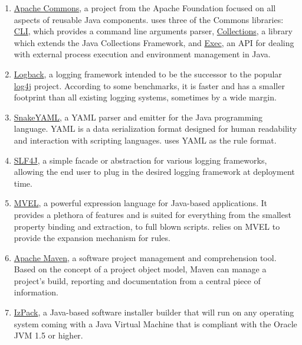 \documentclass[a4paper,twoside,12pt]{memoir}
\begin{document}
\begin{enumerate}
\item \href{http://commons.apache.org}{Apache Commons}, a project from the Apache Foundation focused
on all aspects of reusable Java components. \arara uses three of the Commons libraries:
\href{http://commons.apache.org/cli/}{CLI}, which provides a command line arguments parser,
\href{http://commons.apache.org/collections/}{Collections}, a library which extends the Java Collections
Framework, and \href{http://commons.apache.org/exec/}{Exec}, an API for dealing with external process
execution and environment management in Java.

\item \href{http://logback.qos.ch}{Logback}, a logging framework intended to be the successor to the
popular \href{http://logging.apache.org/log4j/}{log4j} project. According to some benchmarks, it is faster
and has a smaller footprint than all existing logging systems, sometimes by a wide margin.

\item \href{http://code.google.com/p/snakeyaml}{SnakeYAML}, a YAML parser and emitter for the Java
programming language. YAML is a data serialization format designed for human readability and interaction
with scripting languages. \arara uses YAML as the rule format.

\item \href{http://www.slf4j.org/}{SLF4J}, a simple facade or abstraction for various logging frameworks,
allowing the end user to plug in the desired logging framework at deployment time.

\item \href{http://mvel.codehaus.org}{MVEL}, a powerful expression language for Java-based applications.
It provides a plethora of features and is suited for everything from the smallest property binding and extraction,
to full blown scripts. \arara relies on MVEL to provide the expansion mechanism for rules.

\item \href{http://maven.apache.org/}{Apache Maven}, a software project management and comprehension tool.
Based on the concept of a project object model, Maven can manage a project's build, reporting and documentation
from a central piece of information. 

\item \href{http://izpack.github.com}{IzPack}, a Java-based software installer builder that will run on any
operating system coming with a Java Virtual Machine that is compliant with the Oracle JVM 1.5 or higher.
\end{enumerate}
\end{document}
